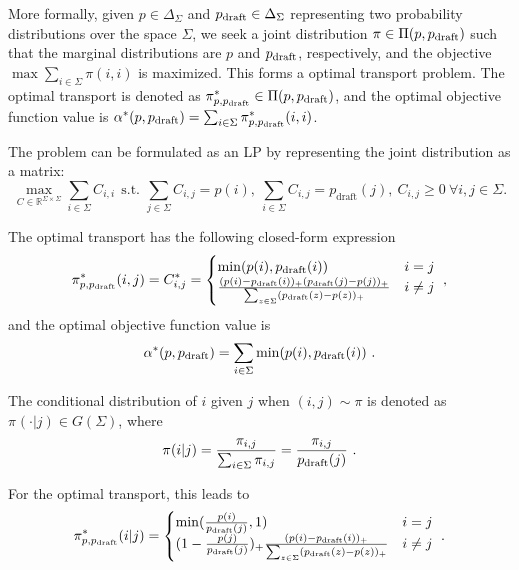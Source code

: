\documentclass{article}
\makeatletter
\newcommand{\myvspace}{\@ifstar\myvspacestar\myvspacenostar}
\newcommand{\myvspacenostar}[1]{}
\newcommand{\myvspacestar}[1]{}
\newcommand{\crvspace}{\@ifstar\crvspacestar\crvspacenostar}
\newcommand{\crvspacenostar}[1]{}
\newcommand{\crvspacestar}[1]{}
\makeatother
\begin{document}
More formally, given $p\in \Delta_\Sigma$ and $p_{\operatorname{draft}}\in \Delta_\Sigma$ representing two probability distributions over the space $\Sigma$, we seek a joint distribution $\pi\in\Pi(p,p_{\operatorname{draft}})$ such that the marginal distributions are $p$ and $p_{\operatorname{draft}}$, respectively, and the objective $\max \sum_{i\in\Sigma} \pi(i,i)$ is maximized. This forms a optimal transport problem. The optimal transport is denoted as $\pi^\ast_{p,p_{\operatorname{draft}}}\in\Pi(p,p_{\operatorname{draft}})$, and the optimal objective function value is $\alpha^\ast(p,p_{\operatorname{draft}})= \sum_{i\in\Sigma} \pi^\ast_{p,p_{\operatorname{draft}}}(i,i)$.

The problem can be formulated as an LP by representing the joint distribution as a matrix:
\myvspace{-4pt}
\begin{equation}
\max_{C \in \mathbb{R}^{\Sigma \times \Sigma}}
\sum_{i \in \Sigma} C_{i,i}
~~
\text{s.t.~}
\sum_{j \in \Sigma} C_{i,j} = p(i), \ \sum_{i \in \Sigma} C_{i,j} = p_{\text{draft}}(j), \ C_{i,j} \geq 0 \  \forall i,j \in \Sigma.
\end{equation}
\par\myvspace{-10pt}
\crvspace{-8pt}
The optimal transport has the following closed-form expression
\myvspace{-3pt}
\crvspace{-3pt}
\begin{equation}
\pi^\ast_{p,p_{\operatorname{draft}}}(i,j)=C^\ast_{i,j}=\begin{cases}\min(p(i),p_{\operatorname{draft}}(i))&i=j\\\frac{(p(i)-p_{\operatorname{draft}}(i))_+(p_{\operatorname{draft}}(j)-p(j))_+}{\sum_{z\in\Sigma}(p_{\operatorname{draft}}(z)-p(z))_+}&i\neq j\end{cases}
~,
\end{equation}
and the optimal objective function value is
\myvspace{-3pt}
\crvspace{-3pt}
\begin{equation}
\alpha^\ast(p,p_{\operatorname{draft}})=\sum_{i\in\Sigma}\min(p(i),p_{\operatorname{draft}}(i))
~.
\end{equation}
\par\myvspace{-10pt}
The conditional distribution of $i$ given $j$ when $(i,j)\sim\pi$ is denoted as $\pi_{}(\cdot|j)\in G(\Sigma)$, where
\myvspace{-3pt}
\begin{equation}
\pi_{}(i|j)=\frac{\pi_{i,j}}{\sum_{i\in\Sigma}\pi_{i,j}}=\frac{\pi_{i,j}}{p_{\operatorname{draft}}(j)}
~.
\end{equation}
\par\myvspace{-10pt}
\crvspace{-8pt}
For the optimal transport, this leads to
\myvspace{-3pt}
\crvspace{-3pt}
\begin{equation}
\pi^\ast_{p,p_{\operatorname{draft}}}(i|j)=\begin{cases}\min(\frac{p(i)}{p_{\operatorname{draft}}(j)},1)&i=j\\(1-\frac{p(j)}{p_{\operatorname{draft}}(j)})_+\frac{(p(i)-p_{\operatorname{draft}}(i))_+}{\sum_{z\in\Sigma}(p_{\operatorname{draft}}(z)-p(z))_+}&i\neq j\end{cases}
~.
\end{equation}
\end{document}
